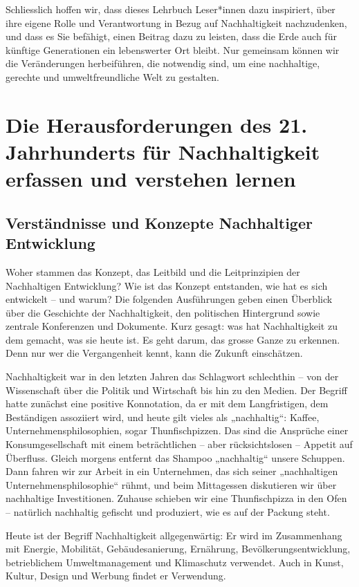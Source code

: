 \documentclass[
  nswissgerman,
  a4paper,
  DIV=11,
  numbers=noendperiod,
  oneside,
  openany]{scrreprt}
\begin{document}
Schliesslich hoffen wir, dass dieses Lehrbuch Leser*innen dazu
inspiriert, über ihre eigene Rolle und Verantwortung in Bezug auf
Nachhaltigkeit nachzudenken, und dass es Sie befähigt, einen Beitrag
dazu zu leisten, dass die Erde auch für künftige Generationen ein
lebenswerter Ort bleibt. Nur gemeinsam können wir die Veränderungen
herbeiführen, die notwendig sind, um eine nachhaltige, gerechte und
umweltfreundliche Welt zu gestalten.

\part{Die Herausforderungen des 21. Jahrhunderts für Nachhaltigkeit
erfassen und verstehen lernen}

\chapter{Verständnisse und Konzepte Nachhaltiger
Entwicklung}\label{verstuxe4ndnisse-und-konzepte-nachhaltiger-entwicklung}

Woher stammen das Konzept, das Leitbild und die Leitprinzipien der
Nachhaltigen Entwicklung? Wie ist das Konzept entstanden, wie hat es
sich entwickelt -- und warum? Die folgenden Ausführungen geben einen
Überblick über die Geschichte der Nachhaltigkeit, den politischen
Hintergrund sowie zentrale Konferenzen und Dokumente. Kurz gesagt: was
hat Nachhaltigkeit zu dem gemacht, was sie heute ist. Es geht darum, das
grosse Ganze zu erkennen. Denn nur wer die Vergangenheit kennt, kann die
Zukunft einschätzen.

Nachhaltigkeit war in den letzten Jahren das Schlagwort schlechthin --
von der Wissenschaft über die Politik und Wirtschaft bis hin zu den
Medien. Der Begriff hatte zunächst eine positive Konnotation, da er mit
dem Langfristigen, dem Beständigen assoziiert wird, und heute gilt
vieles als „nachhaltig``: Kaffee, Unternehmensphilosophien, sogar
Thunfischpizzen. Das sind die Ansprüche einer Konsumgesellschaft mit
einem beträchtlichen -- aber rücksichtslosen -- Appetit auf Überfluss.
Gleich morgens entfernt das Shampoo „nachhaltig`` unsere Schuppen. Dann
fahren wir zur Arbeit in ein Unternehmen, das sich seiner „nachhaltigen
Unternehmensphilosophie`` rühmt, und beim Mittagessen diskutieren wir
über nachhaltige Investitionen. Zuhause schieben wir eine Thunfischpizza
in den Ofen -- natürlich nachhaltig gefischt und produziert, wie es auf
der Packung steht.

Heute ist der Begriff Nachhaltigkeit allgegenwärtig: Er wird im
Zusammenhang mit Energie, Mobilität, Gebäudesanierung, Ernährung,
Bevölkerungsentwicklung, betrieblichem Umweltmanagement und Klimaschutz
verwendet. Auch in Kunst, Kultur, Design und Werbung findet er
Verwendung.
\end{document}
